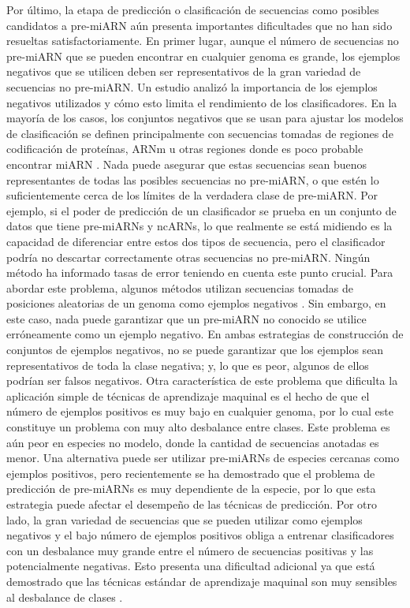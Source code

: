 Por último, la etapa de predicción o clasificación de secuencias como posibles candidatos a pre-miARN aún presenta importantes dificultades que no han sido
resueltas satisfactoriamente. En primer lugar, aunque el número de secuencias no pre-miARN que se pueden encontrar en cualquier genoma es grande, los ejemplos
negativos que se utilicen deben ser representativos de la gran variedad de secuencias no pre-miARN. Un estudio \citep{wei2014improved} analizó la
importancia de los ejemplos negativos utilizados y cómo esto limita el rendimiento de los clasificadores. En la mayoría de los casos, los conjuntos negativos
que se usan para ajustar los modelos de clasificación se definen principalmente con secuencias tomadas de regiones de codificación de proteínas, ARNm u otras
regiones donde es poco probable encontrar miARN \citep{peace2015framework, tempel2015mirboost}. Nada puede asegurar que estas secuencias sean buenos
representantes de todas las posibles secuencias no pre-miARN, o que estén lo suficientemente cerca de los límites de la verdadera clase de pre-miARN. Por ejemplo,
si el poder de predicción de un clasificador se prueba en un conjunto de datos que tiene pre-miARNs y ncARNs, lo que realmente se está midiendo es la capacidad
de diferenciar entre estos dos tipos de secuencia, pero el clasificador podría no descartar correctamente otras secuencias no pre-miARN. Ningún método ha
informado tasas de error teniendo en cuenta este punto crucial. Para abordar este problema, algunos métodos utilizan secuencias tomadas de posiciones aleatorias
de un genoma como ejemplos negativos \citep{wenyuan2013training, gudys2013huntmi}. Sin embargo, en este caso, nada puede garantizar que un pre-miARN no conocido
se utilice erróneamente como un ejemplo negativo. En ambas estrategias de construcción de conjuntos de ejemplos negativos, no se puede garantizar que los
ejemplos sean representativos de toda la clase negativa; y, lo que es peor, algunos de ellos podrían ser falsos negativos. Otra característica de este problema
que dificulta la aplicación simple de técnicas de aprendizaje maquinal es el hecho de que el número de ejemplos positivos es muy bajo en cualquier genoma, por
lo cual este constituye un problema con muy alto desbalance entre clases. Este problema es aún peor en especies no modelo, donde la cantidad de secuencias
anotadas es menor. Una alternativa puede ser utilizar pre-miARNs de especies cercanas como ejemplos positivos, pero recientemente se ha demostrado
\citep{lopes2016automatic} que el problema de predicción de pre-miARNs es muy dependiente de la especie, por lo que esta estrategia puede afectar el desempeño
de las técnicas de predicción. Por otro lado, la gran variedad de secuencias que se pueden utilizar como ejemplos negativos y el bajo número de ejemplos
positivos obliga a entrenar clasificadores con un desbalance muy grande entre el número de secuencias positivas y las potencialmente negativas. Esto presenta
una dificultad adicional ya que está demostrado que las  técnicas estándar de aprendizaje maquinal son muy sensibles al desbalance de clases
\citep{guo2008class}.

